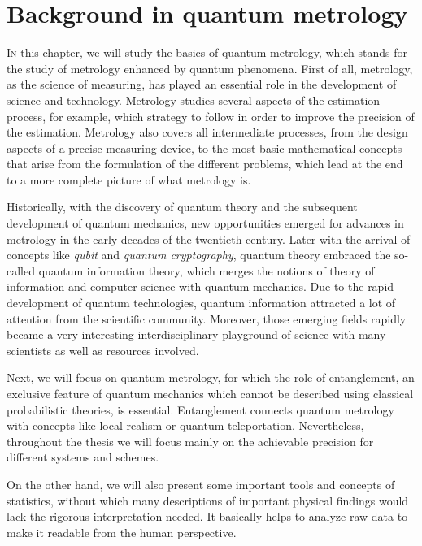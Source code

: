 \section{Background in quantum metrology}

\label{sec:bg}


\vspace{0pt}
\lettrine[lines=2, findent=3pt,nindent=0pt]{I}{n} this chapter, we will study the basics of quantum metrology, which stands for the study of metrology enhanced by quantum phenomena.
First of all, metrology, as the science of measuring, has played an essential role in the development of science and technology.
Metrology studies several aspects of the estimation process, for example, which strategy to follow in order to improve the precision of the estimation.
Metrology also covers all intermediate processes, from the design aspects of a precise measuring device, to the most basic mathematical concepts that arise from the formulation of the different problems, which lead at the end to a more complete picture of what metrology is.

Historically, with the discovery of quantum theory and the subsequent development of quantum mechanics, new opportunities emerged for advances in metrology in the early decades of the twentieth century.
Later with the arrival of concepts like \emph{qubit} and \emph{quantum cryptography}, quantum theory embraced the so-called quantum information theory, which merges the notions of theory of information and computer science with quantum mechanics. 
Due to the rapid development of quantum technologies, quantum information attracted a lot of attention from the scientific community.
Moreover, those emerging fields rapidly became a very interesting interdisciplinary playground of science with many scientists as well as resources involved.

Next, we will focus on quantum metrology, for which the role of entanglement, an exclusive feature of quantum mechanics which cannot be described using classical probabilistic theories, is essential.
Entanglement connects quantum metrology with concepts like local realism or quantum teleportation.
Nevertheless, throughout the thesis we will focus mainly on the achievable precision for different systems and schemes.

On the other hand, we will also present some important tools and concepts of statistics, without which many descriptions of important physical findings would lack the rigorous interpretation needed.
It basically helps to analyze raw data to make it readable from the human perspective.

